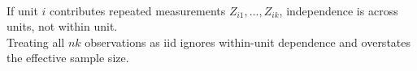 \begin{remark} \label{rem:paired-versus-repeated-measures} \\
If unit $i$ contributes repeated measurements $Z_{i1},\ldots,Z_{ik}$, independence is across units, not within unit.\\
Treating all $nk$ observations as iid ignores within-unit dependence and overstates the effective sample size.
\end{remark}
